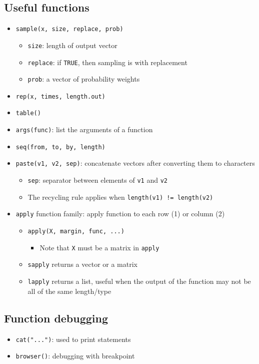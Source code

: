 \documentclass{article}
\begin{document}
\begin{multicols}{2}
\subsection*{Useful functions}
\begin{itemize}
	\item \texttt{sample(x, size, replace, prob)}
	\begin{itemize}
		\item \texttt{size}: length of output vector
		\item \texttt{replace}: if \texttt{TRUE}, then sampling is with replacement
		\item \texttt{prob}: a vector of probability weights
	\end{itemize}
	\item \texttt{rep(x, times, length.out)}
	\item \texttt{table()}
	\item \texttt{args(func)}: list the arguments of a function
	\item \texttt{seq(from, to, by, length)}
	\item \texttt{paste(v1, v2, sep)}: concatenate vectors after converting them to characters
	\begin{itemize}
		\item \texttt{sep}: separator between elements of \texttt{v1} and \texttt{v2}
		\item The recycling rule applies when \texttt{length(v1) != length(v2)}
	\end{itemize}
	\item \texttt{apply} function family: apply function to each row (1) or column (2) 
	\begin{itemize}
		\item \texttt{apply(X, margin, func, ...)}
		\begin{itemize}
			\item Note that \texttt{X} must be a matrix in \texttt{apply}
		\end{itemize}
		\item \texttt{sapply} returns a vector or a matrix
		\item \texttt{lapply} returns a list, useful when the output of the function may not be all of the same length/type
	\end{itemize}
\end{itemize}
\subsection*{Function debugging}
\begin{itemize}
	\item \texttt{cat("...")}: used to print statements
	\item \texttt{browser()}: debugging with breakpoint
\end{itemize}

\end{multicols}
\end{document}
